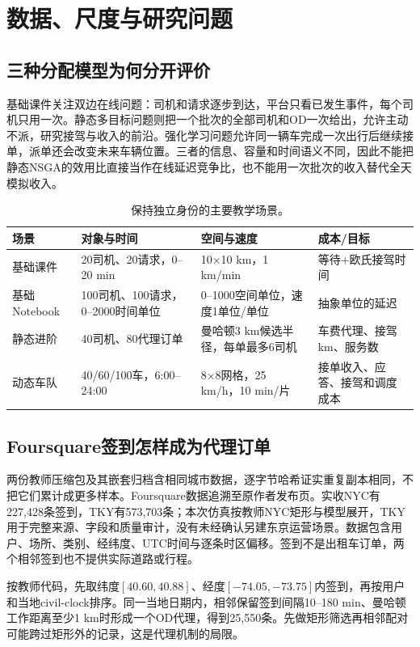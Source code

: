 \section{数据、尺度与研究问题}
\subsection{三种分配模型为何分开评价}
基础课件关注双边在线问题：司机和请求逐步到达，平台只看已发生事件，每个司机只用一次。静态多目标问题则把一个批次的全部司机和OD一次给出，允许主动不派，研究接驾与收入的前沿。强化学习问题允许同一辆车完成一次出行后继续接单，派单还会改变未来车辆位置。三者的信息、容量和时间语义不同，因此不能把静态NSGA的效用比直接当作在线延迟竞争比，也不能用一次批次的收入替代全天模拟收入。

\begin{table}[htbp]\centering\caption{保持独立身份的主要教学场景。}\label{tab:scales}
\begin{tabularx}{\linewidth}{lYYY}\toprule
场景&对象与时间&空间与速度&成本/目标\\\midrule
基础课件&20司机、20请求，0--20 min&10×10 km，1 km/min&等待+欧氏接驾时间\\
基础Notebook&100司机、100请求，0--2000时间单位&0--1000空间单位，速度1单位/单位&抽象单位的延迟\\
静态进阶&40司机、80代理订单&曼哈顿3 km候选半径，每单最多6司机&车费代理、接驾km、服务数\\
动态车队&40/60/100车，6:00--24:00&8×8网格，25 km/h，10 min/片&接单收入、应答、接驾和调度成本\\\bottomrule
\end{tabularx}
\end{table}

\subsection{Foursquare签到怎样成为代理订单}
两份教师压缩包及其嵌套归档含相同城市数据，逐字节哈希证实重复副本相同，不把它们累计成更多样本。Foursquare数据追溯至原作者发布页\cite{foursquare}。实收NYC有227,428条签到，TKY有573,703条；本次仿真按教师NYC矩形与模型展开，TKY用于完整来源、字段和质量审计，没有未经确认另建东京运营场景。数据包含用户、场所、类别、经纬度、UTC时间与逐条时区偏移。签到不是出租车订单，两个相邻签到也不提供实际道路或行程。

按教师代码，先取纬度$[40.60,40.88]$、经度$[-74.05,-73.75]$内签到，再按用户和当地civil-clock排序。同一当地日期内，相邻保留签到间隔10--180 min、曼哈顿工作距离至少1 km时形成一个OD代理，得到25,550条。先做矩形筛选再相邻配对可能跨过矩形外的记录，这是代理机制的局限。

